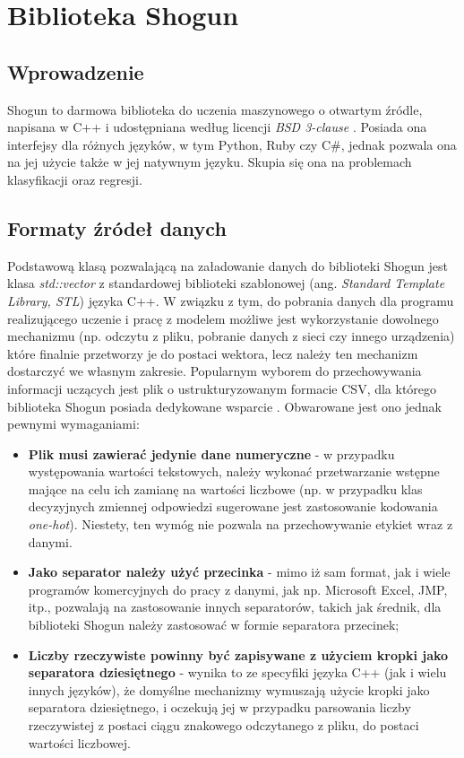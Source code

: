 \chapter{Biblioteka Shogun}

\section{Wprowadzenie}

Shogun to darmowa biblioteka do uczenia maszynowego o otwartym źródle, napisana w C++ i udostępniana według licencji \textit{BSD 3-clause} \cite{shogun:github}. Posiada ona interfejsy dla różnych języków, w tym Python, Ruby czy C\#, jednak pozwala ona na jej użycie także w jej natywnym języku. Skupia się ona na problemach klasyfikacji oraz regresji. 

\section{Formaty źródeł danych}

Podstawową klasą pozwalającą na załadowanie danych do biblioteki Shogun jest klasa \textit{std::vector} z standardowej biblioteki szablonowej (ang. \textit{Standard Template Library, STL}) języka C++. W związku z tym, do pobrania danych dla programu realizującego uczenie i pracę z modelem możliwe jest wykorzystanie dowolnego mechanizmu (np. odczytu z pliku, pobranie danych z sieci czy innego urządzenia) które finalnie przetworzy je do postaci wektora, lecz należy ten mechanizm dostarczyć we własnym zakresie. Popularnym wyborem do przechowywania informacji uczących jest plik o ustrukturyzowanym formacie CSV, dla którego biblioteka Shogun posiada dedykowane wsparcie \cite{handsOnMachineLearning}. Obwarowane jest ono jednak pewnymi wymaganiami:

\begin{itemize}
	\item \textbf{Plik musi zawierać jedynie dane numeryczne} - w przypadku występowania wartości tekstowych, należy wykonać przetwarzanie wstępne mające na celu ich zamianę na wartości liczbowe (np. w przypadku klas decyzyjnych zmiennej odpowiedzi sugerowane jest zastosowanie kodowania \textit{one-hot}). Niestety, ten wymóg nie pozwala na przechowywanie etykiet wraz z danymi.
	
	\item \textbf{Jako separator należy użyć przecinka} - mimo iż sam format, jak i wiele programów komercyjnych do pracy z danymi, jak np. Microsoft Excel, JMP, itp., pozwalają na zastosowanie innych separatorów, takich jak średnik, dla biblioteki Shogun należy zastosować w formie separatora przecinek;
	
	\item \textbf{Liczby rzeczywiste powinny być zapisywane z użyciem kropki jako separatora dziesiętnego} - wynika to ze specyfiki języka C++ (jak i wielu innych języków), że domyślne mechanizmy wymuszają użycie kropki jako separatora dziesiętnego, i oczekują jej w przypadku parsowania liczby rzeczywistej z postaci ciągu znakowego odczytanego z pliku, do postaci wartości liczbowej.
\end{itemize} 

